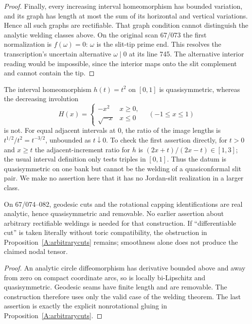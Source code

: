 \begin{proof}
Finally, every increasing interval homeomorphism has bounded
variation, and its graph has length at most the sum of its
horizontal and vertical variations. Hence all such graphs
are rectifiable. That graph condition cannot distinguish
the analytic welding classes above. On the original scan
67/073 the first normalization is $f(\omega)=0$: $\omega$
is the slit-tip prime end. This resolves the transcription's
uncertain alternative $\omega\mid0$ at its line 745. The alternative interior
reading would be impossible, since the interior maps onto
the slit complement and cannot contain the tip.
\end{proof}

\begin{example}\label{A:fold}
The interval homeomorphism $h(t)=t^2$ on $[0,1]$ is
quasisymmetric, whereas the decreasing involution
\[
 H(x)=\begin{cases}-x^2&x\geq0,\\\sqrt{-x}&x\leq0\end{cases}
 \quad(-1\leq x\leq1)
\]
is not. For equal adjacent intervals at $0$, the ratio of
the image lengths is $t^{1/2}/t^2=t^{-3/2}$, unbounded as
$t\downarrow0$. To check the first assertion directly, for
$t>0$ and $x\geq t$ the adjacent-increment ratio for $h$ is
$(2x+t)/(2x-t)\in[1,3]$; the usual interval definition
only tests triples in $[0,1]$. Thus the datum is
quasisymmetric on one bank but cannot be the welding of a
quasiconformal slit pair. We make no assertion here that it
has no Jordan-slit realization in a larger class.
\end{example}

\begin{corollary}\label{A:L5}
On 67/074--082, geodesic cuts and the rotational capping
identifications are real analytic, hence quasisymmetric and
removable. No earlier assertion about arbitrary rectifiable
weldings is needed for that construction. If ``differentiable
cut'' is taken literally without toric compatibility, the
obstruction in Proposition~\ref{A:arbitrarycuts} remains;
smoothness alone does not produce the claimed nodal tensor.
\end{corollary}
\begin{proof}
An analytic circle diffeomorphism has derivative bounded
above and away from zero on compact coordinate arcs, so is
locally bi-Lipschitz and quasisymmetric. Geodesic seams
have finite length and are removable. The construction
therefore uses only the valid case of the welding theorem.
The last assertion is exactly the explicit nonrotational
gluing in Proposition~\ref{A:arbitrarycuts}.
\end{proof}

